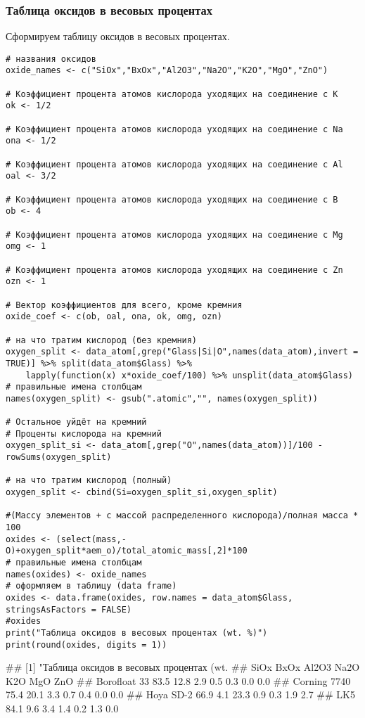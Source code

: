 \subsubsection{Таблица оксидов в весовых процентах}

Сформируем таблицу оксидов в весовых процентах.

\begin{lstlisting}[language=Renhanced]
# названия оксидов
oxide_names <- c("SiOx","BxOx","Al2O3","Na2O","K2O","MgO","ZnO")

# Коэффициент процента атомов кислорода уходящих на соединение с K
ok <- 1/2

# Коэффициент процента атомов кислорода уходящих на соединение с Na
ona <- 1/2

# Коэффициент процента атомов кислорода уходящих на соединение с Al
oal <- 3/2

# Коэффициент процента атомов кислорода уходящих на соединение с B
ob <- 4

# Коэффициент процента атомов кислорода уходящих на соединение с Mg
omg <- 1

# Коэффициент процента атомов кислорода уходящих на соединение с Zn
ozn <- 1

# Вектор коэффициентов для всего, кроме кремния
oxide_coef <- c(ob, oal, ona, ok, omg, ozn)

# на что тратим кислород (без кремния)
oxygen_split <- data_atom[,grep("Glass|Si|O",names(data_atom),invert = TRUE)] %>% split(data_atom$Glass) %>%
    lapply(function(x) x*oxide_coef/100) %>% unsplit(data_atom$Glass)
# правильные имена столбцам
names(oxygen_split) <- gsub(".atomic","", names(oxygen_split))

# Остальное уйдёт на кремний
# Проценты кислорода на кремний
oxygen_split_si <- data_atom[,grep("O",names(data_atom))]/100 - rowSums(oxygen_split)

# на что тратим кислород (полный)
oxygen_split <- cbind(Si=oxygen_split_si,oxygen_split)

#(Массу элементов + с массой распределенного кислорода)/полная масса * 100
oxides <- (select(mass,-O)+oxygen_split*aem_o)/total_atomic_mass[,2]*100
# правильные имена столбцам
names(oxides) <- oxide_names
# оформляем в таблицу (data frame)
oxides <- data.frame(oxides, row.names = data_atom$Glass, stringsAsFactors = FALSE)
#oxides
print("Таблица оксидов в весовых процентах (wt. %)")
print(round(oxides, digits = 1))
\end{lstlisting}

\begin{Verb}
## [1] "Таблица оксидов в весовых процентах (wt. %
##              SiOx BxOx Al2O3 Na2O K2O MgO ZnO
## Borofloat 33 83.5 12.8   2.9  0.5 0.3 0.0 0.0
## Corning 7740 75.4 20.1   3.3  0.7 0.4 0.0 0.0
## Hoya SD-2    66.9  4.1  23.3  0.9 0.3 1.9 2.7
## LK5          84.1  9.6   3.4  1.4 0.2 1.3 0.0
\end{Verb}

